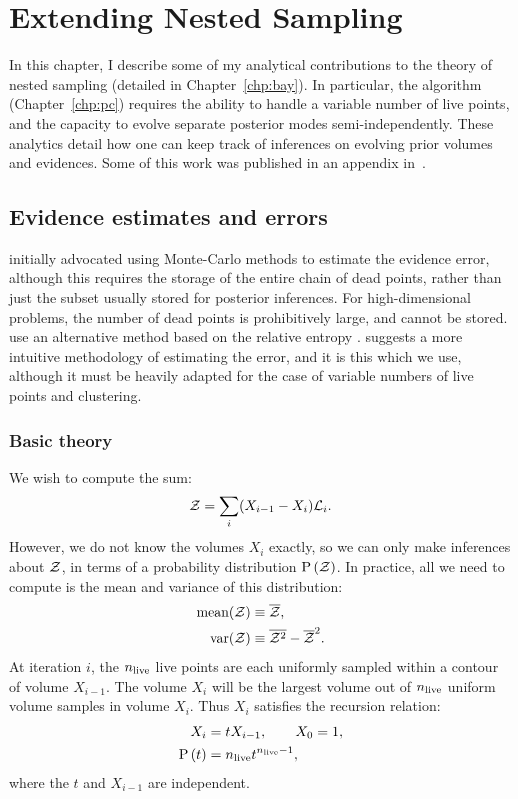 \chapter{Extending Nested Sampling}
\label{chp:ens}

In this chapter, I describe some of my analytical contributions to the theory of nested sampling (detailed in Chapter~\ref{chp:bay}). In particular, the \PolyChord{} algorithm (Chapter~\ref{chp:pc}) requires the ability to handle a variable number of live points, and the capacity to evolve separate posterior modes semi-independently. These analytics detail how one can keep track of inferences on evolving prior volumes and evidences. 
Some of this work was published in an appendix in~\cite{polychordpaper}.

\section{Evidence estimates and errors}                            
\label{sec:ens:evidences}

\cite{skilling2006} initially advocated using Monte-Carlo methods to estimate the evidence error, although this requires the storage of the entire chain of dead points, rather than just the subset usually stored for posterior inferences. For high-dimensional problems, the number of dead points is prohibitively large, and cannot be stored.
\cite{MultiNest2} use an alternative method based on the relative entropy \citep[also suggested by][]{skilling2006}. 
\cite{Keeton} suggests a more intuitive methodology of estimating the error, and it is this which we use, although it must be heavily adapted for the case of variable numbers of live points and clustering.

\subsection{Basic theory}
\label{sec:ens:basic_theory}

We wish to compute the sum:
%
\begin{equation}
  \mathcal{Z} = \sum\limits_{i} (X_{i-1}-X_{i})\mathcal{L}_i.
  \label{eqn:ens:app_ev}
\end{equation}
%
However, we do not know the volumes \(X_i\) exactly, so we can only make inferences about \(\mathcal{Z}\), in terms of a probability distribution \(\mathrm{P}\left(\mathcal{Z}\right)\). In practice, all we need to compute is the mean and variance of this distribution:
\begin{align}
  \text{mean}(\mathcal{Z}) &\equiv \overline{\mathcal{Z}},\\
  \text{var}(\mathcal{Z}) &\equiv \overline{\mathcal{Z}^2}-\overline{\mathcal{Z}}^2.
\end{align}
%
At iteration \(i\), the \(n_{\mathrm{live}}\) live points are each uniformly sampled within a contour of volume \(X_{i-1}\). The volume \(X_i\) will be the largest volume out of \(n_{\mathrm{live}}\) uniform volume samples in volume \(X_i\).
Thus \(X_i\) satisfies the recursion relation:
%
\begin{align}
  X_i &= t X_{i-1}, \qquad X_0=1, \label{eqn:ens:rr_x} \\
  \mathrm{P}\left(t\right) &= n_{\mathrm{live}} t^{n_{\mathrm{live}} - 1}, \label{eqn:ens:Pt}
\end{align}
%
where the \(t\) and \(X_{i-1}\) are independent.


